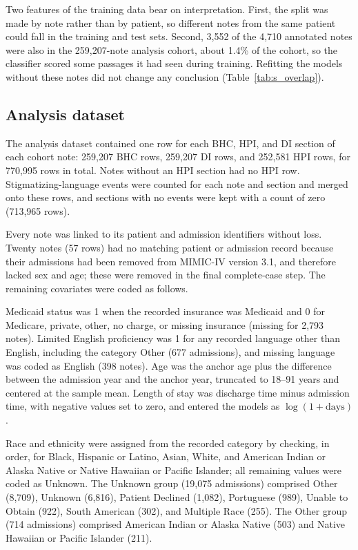 \documentclass[unnumsec,webpdf,contemporary,large]{oup-authoring-template}
\begin{document}
Two features of the training data bear on interpretation. First, the split was made by note rather than by patient, so different notes from the same patient could fall in the training and test sets. Second, 3,552 of the 4,710 annotated notes were also in the 259,207-note analysis cohort, about 1.4\% of the cohort, so the classifier scored some passages it had seen during training.
Refitting the models without these notes did not change any conclusion (Table~\ref{tab:s_overlap}).

\subsection{Analysis dataset}

The analysis dataset contained one row for each BHC, HPI, and DI section of each cohort note: 259,207 BHC rows, 259,207 DI rows, and 252,581 HPI rows, for 770,995 rows in total. Notes without an HPI section had no HPI row. Stigmatizing-language events were counted for each note and section and merged onto these rows, and sections with no events were kept with a count of zero (713,965 rows).

Every note was linked to its patient and admission identifiers without loss. Twenty notes (57 rows) had no matching patient or admission record because their admissions had been removed from MIMIC-IV version 3.1, and therefore lacked sex and age; these were removed in the final complete-case step. The remaining covariates were coded as follows.

Medicaid status was 1 when the recorded insurance was Medicaid and 0 for Medicare, private, other, no charge, or missing insurance (missing for 2,793 notes). Limited English proficiency was 1 for any recorded language other than English, including the category Other (677 admissions), and missing language was coded as English (398 notes). Age was the anchor age plus the difference between the admission year and the anchor year, truncated to 18--91 years and centered at the sample mean. Length of stay was discharge time minus admission time, with negative values set to zero, and entered the models as \(\log(1+\text{days})\).

Race and ethnicity were assigned from the recorded category by checking, in order, for Black, Hispanic or Latino, Asian, White, and American Indian or Alaska Native or Native Hawaiian or Pacific Islander; all remaining values were coded as Unknown. The Unknown group (19,075 admissions) comprised Other (8,709), Unknown (6,816), Patient Declined (1,082), Portuguese (989), Unable to Obtain (922), South American (302), and Multiple Race (255). The Other group (714 admissions) comprised American Indian or Alaska Native (503) and Native Hawaiian or Pacific Islander (211).
\end{document}

